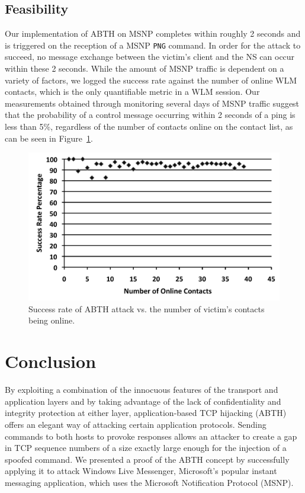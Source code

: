 \documentclass{sig-alternate}
\begin{document}
\vfil\eject

\subsection{Feasibility}
\label{sec:feasibility}

Our implementation of ABTH on MSNP completes within roughly 2 seconds and is triggered on the reception of a MSNP \texttt{PNG} command.
In order for the attack to succeed, no message exchange between the victim's client and the NS can occur within these 2 seconds.
While the amount of MSNP traffic is dependent on a variety of factors, we logged the success rate against the number of online WLM contacts, which is the only quantifiable metric in a WLM session.
Our measurements obtained through monitoring several days of MSNP traffic suggest that the probability of a control message occurring within 2 seconds of a ping is less than 5\%, regardless of the number of contacts online on the contact list, as can be seen in Figure~\ref{fig:successrate}.

\begin{figure}[h]
	\centering
	\caption{Success rate of ABTH attack vs. the number of victim's contacts being online.}
	\label{fig:successrate}
	\includegraphics[width=\columnwidth]{graphics/plot}
\end{figure}


\section{Conclusion}
\label{sec:conclusion}

By exploiting a combination of the innocuous features of the transport and application layers and by taking advantage of the lack of confidentiality and integrity protection at either layer, application-based TCP hijacking (ABTH) offers an elegant way of attacking certain application protocols.
Sending commands to both hosts to provoke responses allows an attacker to create a gap in TCP sequence numbers of a size exactly large enough for the injection of a spoofed command.
We presented a proof of the ABTH concept by successfully applying it to attack Windows Live Messenger, Microsoft's popular instant messaging application, which uses the Microsoft Notification Protocol (MSNP).
\end{document}
